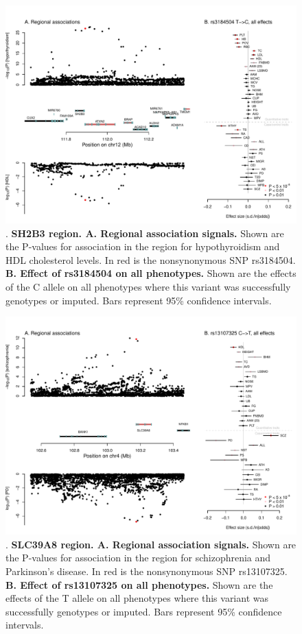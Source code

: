 \documentclass[11pt,titlepage]{article}
\begin{document}
\begin{figure}
\begin{center}
\includegraphics[scale = 0.6]{figs/SH2B3_region.pdf}
\caption{. \textbf{SH2B3 region. A. Regional association signals.} Shown are the P-values for association in the region for hypothyroidism and HDL cholesterol levels. In red is the nonsynonymous SNP rs3184504. \textbf{B. Effect of rs3184504 on all phenotypes.} Shown are the effects of the C allele on all phenotypes where this variant was successfully genotypes or imputed. Bars represent 95\% confidence intervals. }\label{f_sh2b3}
\end{center}
\end{figure}

\begin{figure}
\begin{center}
\includegraphics[scale = 0.6]{figs/SLC39A8_region.pdf}
\caption{. \textbf{SLC39A8 region. A. Regional association signals.} Shown are the P-values for association in the region for schizophrenia and Parkinson's disease. In red is the nonsynonymous SNP rs13107325. \textbf{B. Effect of rs13107325 on all phenotypes.} Shown are the effects of the T allele on all phenotypes where this variant was successfully genotypes or imputed. Bars represent 95\% confidence intervals. }\label{f_slc}
\end{center}
\end{figure}
\end{document}

